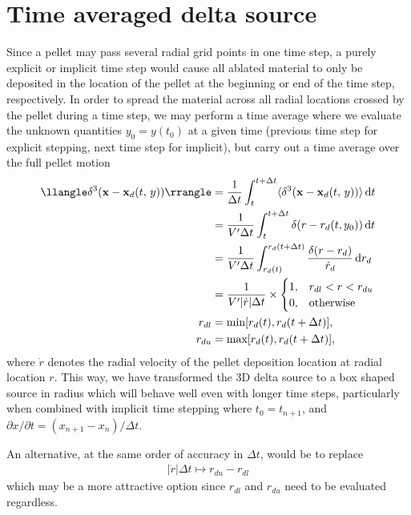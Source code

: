 \documentclass[11pt,a4paper]{article}
\newcommand{\rd}{\ensuremath{\mathrm{d}}}
\renewcommand{\b}[1]{\ensuremath{ {\bf #1 } }}
\begin{document}
\section*{Time averaged delta source}
Since a pellet may pass several radial grid points in one time step, a purely explicit or implicit time step would cause all ablated material to only be deposited in the location of the pellet at the beginning or end of the time step, respectively. In order to spread the material across all radial locations crossed by the pellet during a time step, we may perform a time average where we evaluate the unknown quantities $y_0 = y(t_0)$ at a given time (previous time step for explicit stepping, next time step for implicit), but carry out a time average over the full pellet motion
\begin{align}
\llangle\delta^3( \b{x} - \b{x}_d(t,\,y)) \rrangle &= \frac{1}{\Delta t} \int_t^{t+\Delta t}  \langle \delta^3( \b{x} - \b{x}_d(t,\,y))\rangle \, \rd t \nonumber \\
&= \frac{1}{V'\Delta t} \int_t^{t+\Delta t} \delta(r-r_d(t,y_0)) \, \rd t  \nonumber\\
&= \frac{1}{V'\Delta t} \int_{r_d(t)}^{r_d(t+\Delta t)}\frac{\delta(r-r_d)}{\dot{r}_d} \, \rd r_d \nonumber \\
&= \frac{1}{V'|\dot{r}| \Delta t } \times \begin{cases}
1, & r_{dl} < r < r_{du}  \\
0, & \text{otherwise}
\end{cases} \nonumber \\
r_{dl} &= \text{min}[r_d(t),r_d(t+\Delta t)], \nonumber \\
r_{du} &=  \text{max}[r_d(t),r_d(t+\Delta t)],
\end{align}
where $\dot{r}$ denotes the radial velocity of the pellet deposition location at radial location $r$. This way, we have transformed the 3D delta source to a box shaped source in radius which will behave well even with longer time steps, particularly when combined with implicit time stepping where $t_0 = t_{n+1}$, and $\partial x/\partial t = (x_{n+1}-x_n)/\Delta t$.

An alternative, at the same order of accuracy in $\Delta t$, would be to replace
\begin{align}
|\dot{r}|\Delta t \mapsto r_{du}-r_{dl}
\end{align}
which may be a more attractive option since $r_{dl}$ and $r_{du}$ need to be evaluated regardless.
\end{document}
